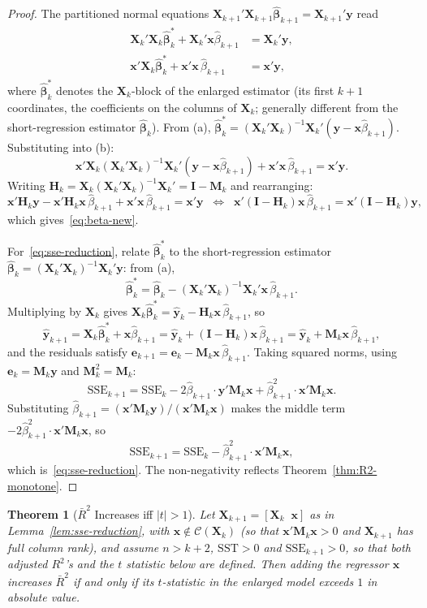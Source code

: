\documentclass[14pt]{extarticle}
\theoremstyle{plain}
\newtheorem{theorem}{Theorem}[section]
\theoremstyle{definition}
\theoremstyle{remark}
\newcommand{\ifff}{\;\Longleftrightarrow\;}
\newcommand{\SST}{\mathrm{SST}}
\newcommand{\SSE}{\mathrm{SSE}}
\newcommand{\bX}{\mathbf{X}}
\newcommand{\by}{\mathbf{y}}
\newcommand{\bx}{\mathbf{x}}
\def\bb{\boldsymbol{\beta}}
\newcommand{\bI}{\mathbf{I}}
\newcommand{\bH}{\mathbf{H}}
\newcommand{\bM}{\mathbf{M}}
\newcommand{\calC}{\mathcal{C}}
\begin{document}
\begin{proof}
The partitioned normal equations $\bX_{k+1}'\bX_{k+1}\hat{\bb}_{k+1} = \bX_{k+1}'\by$ read
\begin{align*}
\bX_k'\bX_k\hat{\bb}_k^* + \bX_k'\bx\hat{\beta}_{k+1} &= \bX_k'\by, \tag{a}\\
\bx'\bX_k\hat{\bb}_k^* + \bx'\bx\,\hat{\beta}_{k+1} &= \bx'\by, \tag{b}
\end{align*}
where $\hat{\bb}_k^*$ denotes the $\bX_k$-block of the enlarged estimator (its first $k+1$ coordinates, the coefficients on the columns of $\bX_k$; generally different from the short-regression estimator $\hat{\bb}_k$). From (a), $\hat{\bb}_k^* = (\bX_k'\bX_k)^{-1}\bX_k'(\by - \bx\hat{\beta}_{k+1})$. Substituting into (b):
\[
\bx'\bX_k(\bX_k'\bX_k)^{-1}\bX_k'(\by - \bx\hat{\beta}_{k+1}) + \bx'\bx\,\hat{\beta}_{k+1} = \bx'\by.
\]
Writing $\bH_k = \bX_k(\bX_k'\bX_k)^{-1}\bX_k' = \bI - \bM_k$ and rearranging:
\[
\bx'\bH_k\by - \bx'\bH_k\bx\,\hat{\beta}_{k+1} + \bx'\bx\,\hat{\beta}_{k+1} = \bx'\by
\;\ifff\; \bx'(\bI - \bH_k)\bx\,\hat{\beta}_{k+1} = \bx'(\bI - \bH_k)\by,
\]
which gives~\eqref{eq:beta-new}.

For~\eqref{eq:sse-reduction}, relate $\hat{\bb}_k^*$ to the short-regression estimator $\hat{\bb}_k = (\bX_k'\bX_k)^{-1}\bX_k'\by$: from (a),
\[
\hat{\bb}_k^* = \hat{\bb}_k - (\bX_k'\bX_k)^{-1}\bX_k'\bx\,\hat{\beta}_{k+1}.
\]
Multiplying by $\bX_k$ gives $\bX_k\hat{\bb}_k^* = \hat{\by}_k - \bH_k\bx\,\hat{\beta}_{k+1}$, so
\[
\hat{\by}_{k+1} = \bX_k\hat{\bb}_k^* + \bx\hat{\beta}_{k+1} = \hat{\by}_k + (\bI - \bH_k)\bx\,\hat{\beta}_{k+1} = \hat{\by}_k + \bM_k\bx\,\hat{\beta}_{k+1},
\]
and the residuals satisfy $\mathbf{e}_{k+1} = \mathbf{e}_k - \bM_k\bx\,\hat{\beta}_{k+1}$. Taking squared norms, using $\mathbf{e}_k = \bM_k\by$ and $\bM_k^2 = \bM_k$:
\[
\SSE_{k+1} = \SSE_k - 2\hat{\beta}_{k+1}\cdot\by'\bM_k\bx + \hat{\beta}_{k+1}^2\cdot\bx'\bM_k\bx.
\]
Substituting $\hat{\beta}_{k+1} = (\bx'\bM_k\by)/(\bx'\bM_k\bx)$ makes the middle term $-2\hat{\beta}_{k+1}^2\cdot\bx'\bM_k\bx$, so
\[
\SSE_{k+1} = \SSE_k - \hat{\beta}_{k+1}^2\cdot\bx'\bM_k\bx,
\]
which is~\eqref{eq:sse-reduction}. The non-negativity reflects Theorem~\ref{thm:R2-monotone}.
\end{proof}

\begin{theorem}[$\bar{R}^2$ Increases iff $|t| > 1$]\label{thm:adj-R2}
Let $\bX_{k+1} = [\bX_k \;\; \bx]$ as in Lemma~\ref{lem:sse-reduction}, with $\bx \notin \calC(\bX_k)$ (so that $\bx'\bM_k\bx > 0$ and $\bX_{k+1}$ has full column rank), and assume $n > k + 2$, $\SST > 0$ and $\SSE_{k+1} > 0$, so that both adjusted $R^2$'s and the $t$ statistic below are defined. Then adding the regressor $\bx$ increases $\bar{R}^2$ if and only if its $t$-statistic in the enlarged model exceeds $1$ in absolute value.
\end{theorem}
\end{document}

